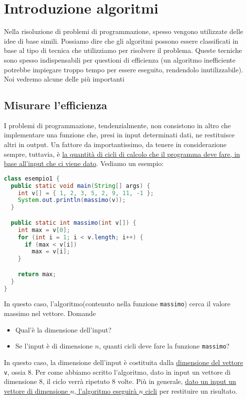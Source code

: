 \section{Introduzione algoritmi}
Nella risoluzione di problemi di programmazione, spesso vengono utilizzate delle idee di base simili. Possiamo dire che gli algoritmi possono essere classificati in base al tipo di tecnica che utilizziamo per risolvere il problema.
\vskip3mm
Queste tecniche sono spesso indispensabili per questioni di efficienza (un algoritmo inefficiente potrebbe impiegare troppo tempo per essere eseguito, rendendolo inutilizzabile). Noi vedremo alcune delle più importanti

\subsection{Misurare l'efficienza}
I problemi di programmazione, tendenzialmente, non consistono in altro che implementare una funzione che, presi in input determinati dati, ne restituisce altri in output. Un fattore da importantissimo, da tenere in considerazione sempre, tuttavia, è \underline{la quantità di cicli di calcolo che il programma deve fare, in base all'input che ci viene dato}. Vediamo un esempio:

\begin{lstlisting}[language = java, frame = none]
  class esempio1 {
  public static void main(String[] args) {
    int v[] = { 1, 2, 3, 5, 2, 9, 11, -1 };
    System.out.println(massimo(v));
  }

  public static int massimo(int v[]) {
    int max = v[0];
    for (int i = 1; i < v.length; i++) {
      if (max < v[i])
        max = v[i];
    }

    return max;
  }
}

\end{lstlisting}

In questo caso, l'algoritmo(contenuto nella funzione \verb|massimo|) cerca il valore massimo nel vettore. Domande
\begin{itemize}
	\item Qual'è la dimensione dell'input?
	\item Se l'input è di dimensione $ n $, quanti cicli deve fare la funzione \verb|massimo|?
\end{itemize}
In questo caso, la dimensione dell'input è costituita dalla \underline{dimensione del vettore} \verb|v|, ossia 8.
\vskip3mm
Per come abbiamo scritto l'algoritmo, dato in input un vettore di dimensione 8, il ciclo verrà ripetuto 8 volte. Più in generale, \underline{dato un input un vettore di dimensione $ n $, l'algoritmo eseguirà $ n $ cicli} per restituire un risultato.
\begin{center}
\end{center}
